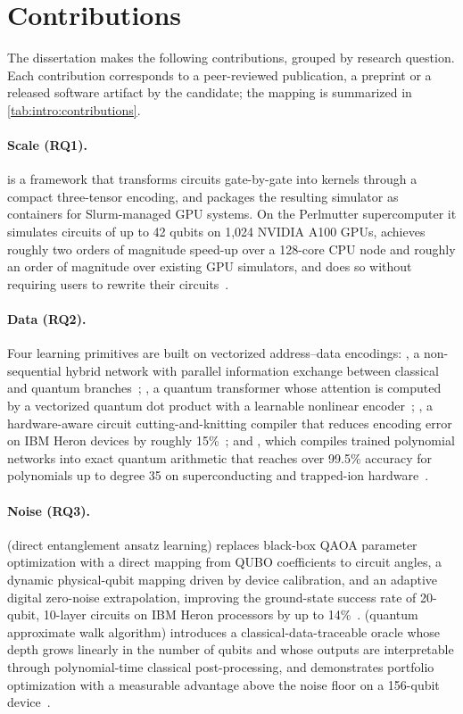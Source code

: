 \section{Contributions}\label{sec:intro:contributions}

The dissertation makes the following contributions, grouped by research question. Each contribution corresponds to a peer-reviewed publication, a preprint or a released software artifact by the candidate; the mapping is summarized in \cref{tab:intro:contributions}.

\paragraph{Scale (RQ1).}
\qgear{} is a framework that transforms \qiskit{} circuits gate-by-gate into \cudaq{} kernels through a compact three-tensor encoding, and packages the resulting simulator as containers for Slurm-managed GPU systems. On the Perlmutter supercomputer it simulates circuits of up to 42 qubits on 1,024 NVIDIA A100 GPUs, achieves roughly two orders of magnitude speed-up over a 128-core CPU node and roughly an order of magnitude over existing GPU simulators, and does so without requiring users to rewrite their circuits~\cite{guo2025qgear}.

\paragraph{Data (RQ2).}
Four learning primitives are built on vectorized address--data encodings: \qpie{}, a non-sequential hybrid network with parallel information exchange between classical and quantum branches~\cite{guo2025qpie}; \vqt{}, a quantum transformer whose attention is computed by a vectorized quantum dot product with a learnable nonlinear encoder~\cite{guo2025vqt}; \shardq{}, a hardware-aware circuit cutting-and-knitting compiler that reduces encoding error on IBM Heron devices by roughly 15\%~\cite{guo2025shardq}; and \nnqa{}, which compiles trained polynomial networks into exact quantum arithmetic that reaches over 99.5\% accuracy for polynomials up to degree 35 on superconducting and trapped-ion hardware~\cite{guo2026nnqa}.

\paragraph{Noise (RQ3).}
\deal{} (direct entanglement ansatz learning) replaces black-box QAOA parameter optimization with a direct mapping from QUBO coefficients to circuit angles, a dynamic physical-qubit mapping driven by device calibration, and an adaptive digital zero-noise extrapolation, improving the ground-state success rate of 20-qubit, 10-layer circuits on IBM Heron processors by up to 14\%~\cite{guo2025deal}. \qawa{} (quantum approximate walk algorithm) introduces a classical-data-traceable oracle whose depth grows linearly in the number of qubits and whose outputs are interpretable through polynomial-time classical post-processing, and demonstrates portfolio optimization with a measurable advantage above the noise floor on a 156-qubit device~\cite{guo2025qawa}.


